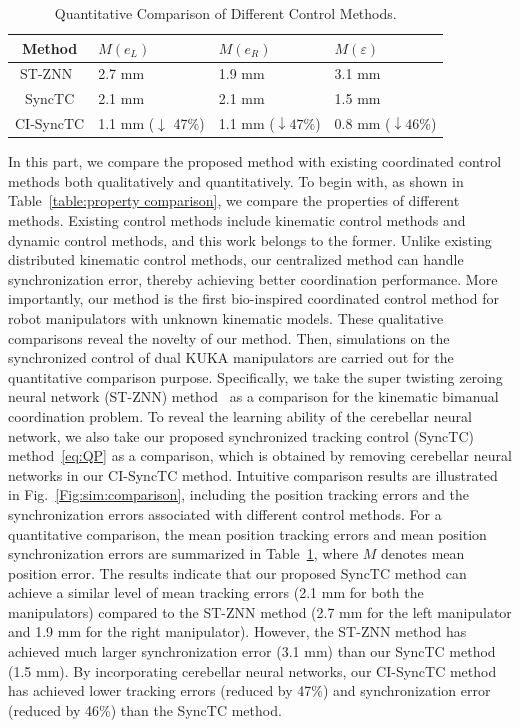 \documentclass[journal,twoside,web]{ieeecolor}
\begin{document}
\begin{table}[!tbp]
\centering
\caption{Quantitative Comparison of Different Control Methods.}
\tabcolsep=5pt
\begin{tabular}{clll}
\toprule
Method                                       & $M(e_L)$ & $M(e_R)$ & $M(\varepsilon)$ \\ \midrule
ST-ZNN~\cite{Chen2020} & 2.7 mm   & 1.9 mm   & 3.1 mm   \\
SyncTC                                       & 2.1 mm   & 2.1 mm   & 1.5 mm   \\
CI-SyncTC                                    & 1.1 mm ($\downarrow$ 47\%)   & 1.1 mm ($\downarrow 47$\%)  & 0.8 mm ($\downarrow 46$\%)  \\ \bottomrule
\end{tabular}
\label{table:method comparison}
\end{table}

In this part, we compare the proposed method with existing coordinated control methods both qualitatively and quantitatively. To begin with, as shown in Table~\ref{table:property comparison}, we compare the properties of different methods. Existing control methods include kinematic control methods and dynamic control methods, and this work belongs to the former. Unlike existing distributed kinematic control methods, our centralized method can handle synchronization error, thereby achieving better coordination performance. More importantly, our method is the first bio-inspired coordinated control method for robot manipulators with unknown kinematic models. These qualitative comparisons reveal the novelty of our method. Then, simulations on the synchronized control of dual KUKA manipulators are carried out for the quantitative comparison purpose. Specifically, we take the super twisting zeroing neural network (ST-ZNN) method~\cite{Chen2020} as a comparison for the kinematic bimanual coordination problem. To reveal the learning ability of the cerebellar neural network, we also take our proposed synchronized tracking control (SyncTC) method~\eqref{eq:QP} as a comparison, which is obtained by removing cerebellar neural networks in our CI-SyncTC method. Intuitive comparison results are illustrated in Fig.~\ref{Fig:sim:comparison}, including the position tracking errors and the synchronization errors associated with different control methods. For a quantitative comparison, the mean position tracking errors and mean position synchronization errors are summarized in Table~\ref{table:method comparison}, where $M$ denotes mean position error. The results indicate that our proposed SyncTC method can achieve a similar level of mean tracking errors (2.1 mm for both the manipulators) compared to the ST-ZNN method (2.7 mm for the left manipulator and 1.9 mm for the right manipulator). However, the ST-ZNN method has achieved much larger synchronization error (3.1 mm) than our SyncTC method (1.5 mm). By incorporating cerebellar neural networks, our CI-SyncTC method has achieved lower tracking errors (reduced by 47\%) and synchronization error (reduced by 46\%) than the SyncTC method.
\end{document}
